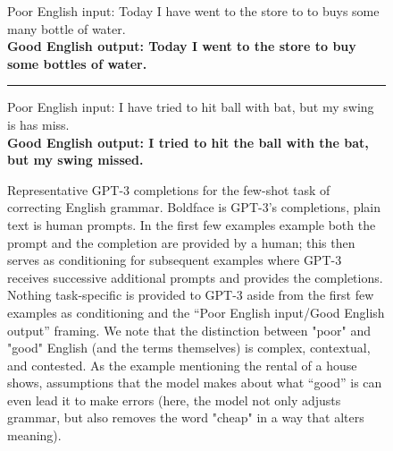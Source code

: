 \documentclass{article}
\begin{document}
\begin{figure}
{{{{\color{gray}Poor English input: Today I have went to the store to to buys some many bottle of water.\\}
\textbf{Good English output: Today I went to the store to buy some bottles of water.}\\ \rule{\linewidth}{0.8pt}\vspace{0.5em}
{\color{gray}Poor English input: I have tried to hit ball with bat, but my swing is has miss.\\}
\textbf{Good English output: I tried to hit the ball with the bat, but my swing missed.}}
}}
\caption{Representative GPT-3 completions for the few-shot task of correcting English grammar.  Boldface is GPT-3’s completions, plain text is human prompts.  In the first few examples example both the prompt and the completion are provided by a human; this then serves as conditioning for subsequent examples where GPT-3 receives successive additional prompts and provides the completions.  Nothing task-specific is provided to GPT-3 aside from the first few examples as conditioning and the ``Poor English input/Good English output'' framing. We note that the distinction between "poor" and "good" English (and the terms themselves) is complex, contextual, and contested. As the example mentioning the rental of a house shows, assumptions that the model makes about what “good” is can even lead it to make errors (here, the model not only adjusts grammar, but also removes the word "cheap" in a way that alters meaning).}
\label{completion:grammar}

\end{figure}
\end{document}
